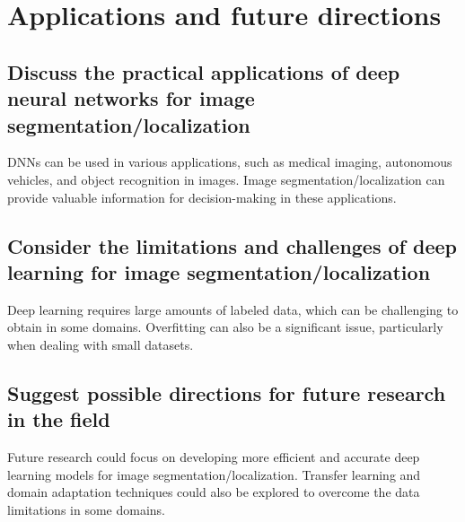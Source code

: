 


\chapter{Applications and future directions}

    \section{Discuss the practical applications of deep neural networks for image segmentation/localization}

        DNNs can be used in various applications, such as medical imaging, autonomous vehicles, and object recognition in images.
        Image segmentation/localization can provide valuable information for decision-making in these applications.

    \section{Consider the limitations and challenges of deep learning for image segmentation/localization}

        Deep learning requires large amounts of labeled data, which can be challenging to obtain in some domains.
        Overfitting can also be a significant issue, particularly when dealing with small datasets.

    \section{Suggest possible directions for future research in the field}

        Future research could focus on developing more efficient and accurate deep learning models for image segmentation/localization.
        Transfer learning and domain adaptation techniques could also be explored to overcome the data limitations in some domains.
